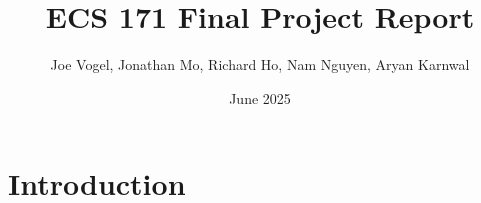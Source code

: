 \documentclass{article}
\title{ECS 171 Final Project Report}
\author{Joe Vogel, Jonathan Mo, Richard Ho, Nam Nguyen, Aryan Karnwal}
\date{June 2025}
\begin{document}
\maketitle

\section{Introduction}
\end{document}
